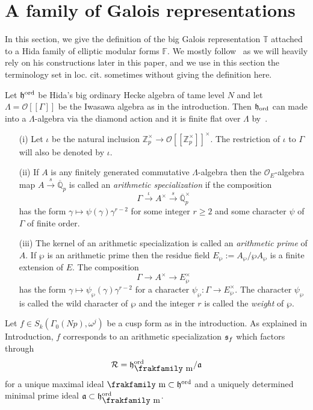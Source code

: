 \documentclass[12pt]{amsart}
\numberwithin{equation}{section}
\newenvironment{define}{\par\medskip\noindent\refstepcounter{thm}
\bgroup{\hspace*{-0.15 cm}\bf{Definition}
\thethm.}\bgroup}{\egroup \egroup\par\medskip}
\begin{document}
\section{A family of Galois representations}
\label{sec:setupGalRep}
In this section, we give the definition of the big Galois representation ${\mathbb{T}}$ attached to a Hida family of elliptic modular forms $\mathbb{F}$. We mostly follow~\cite[\S 2]{howard} as we will heavily rely on his constructions later in this paper, and we use in this section the terminology set in loc. cit.  sometimes without giving the definition here.

Let $\frak{h}^{\textup{ord}}$ be Hida's big ordinary Hecke algebra of tame level $N$ and let ${\Lambda}= {\mathcal{O}}[[\Gamma]]$ be the Iwasawa algebra as in the introduction. Then $\frak{h}_{\textup{ord}}$ can made into a ${\Lambda}$-algebra via the diamond action and it is finite flat over ${\Lambda}$ by~\cite[Theorem 1.1]{hidainv86}.
\begin{define}
\label{def:arithmeticspecialization}
\begin{itemize}
\item[(i)] Let $\iota$ be the natural inclusion ${\mathbb{Z}}_p^\times {\rightarrow} {\mathcal{O}}[[{\mathbb{Z}}_p^\times]]^\times$. The restriction of $\iota$ to $\Gamma$ will also be denoted by $\iota$.
\item[(ii)] If $A$ is any finitely generated commutative ${\Lambda}$-algebra then the ${\mathcal{O}}_E$-algebra map $A \stackrel{s}{\rightarrow} \overline{\mathbb{Q}}_p$ is called an \emph{arithmetic specialization} if the composition
$$\Gamma \stackrel{\iota}{\longrightarrow} A^\times \stackrel{s}{\longrightarrow}  \overline{\mathbb{Q}}_p^\times$$
has the form $\gamma \mapsto \psi(\gamma)\gamma^{r-2}$ for some integer $r\geq 2$ and some character $\psi$ of $\Gamma$ of finite order.
\item[(iii)] The kernel of an arithmetic specialization is called an \emph{arithmetic prime} of $A$. If $\wp$ is an arithmetic prime then the residue field $E_\wp:=A_\wp/\wp A_\wp$ is a finite extension of $E$. The composition
$$\Gamma {\longrightarrow} A^\times {\longrightarrow} E_\wp^\times$$
has the form $\gamma \mapsto \psi_\wp(\gamma)\gamma^{r-2}$ for a character $\psi_\wp:\Gamma {\rightarrow} E_\wp^\times$. The character $\psi_\wp$ is called the wild character of $\wp$ and the integer $r$ is called the \emph{weight} of $\wp$.
\end{itemize}
\end{define}
Let $f \in S_k(\Gamma_0(Np),\omega^j)$ be a cusp form as in the introduction. As explained in Introduction, $f$ corresponds to an arithmetic specialization $\frak{s}_f$ which factors through
$$\mathcal{R}=\frak{h}^{\textup{ord}}_{\hbox{\frakfamily m}}/\frak{a}$$
for a unique maximal ideal ${\hbox{\frakfamily m}} \subset \frak{h}^{\textup{ord}}$ and a uniquely determined minimal prime ideal $\frak{a} \subset \frak{h}^{\textup{ord}}_{\hbox{\frakfamily m}}$.
\end{document}

